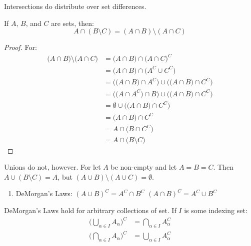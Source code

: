         Intersections do distribute over set differences.
        \begin{theorem}
            If $A$, $B$, and $C$ are sets, then:
            \begin{equation}
                A\cap(B\setminus{C})=
                (A\cap{B})\setminus(A\cap{C})
            \end{equation}
        \end{theorem}
        \begin{proof}
            For:
            \begin{subequations}
                \begin{align}
                    \big(A\cap{B}\big)\setminus\big(A\cap{C}\big)
                    &=\big(A\cap{B}\big)\cap\big(A\cap{C}\big)^{C}\\
                    &=\big(A\cap{B}\big)\cap\big(A^{C}\cup{C}^{C}\big)\\
                    &=\Big(\big(A\cap{B}\big)\cap{A}^{C}\Big)
                        \cup\Big(\big({A}\cap{B}\big)\cap{C}^{C}\Big)\\
                    &=\Big(\big(A\cap{A}^{C}\big)\cap{B}\Big)\cup
                        \Big(\big(A\cap{B}\big)\cap{C}^{C}\Big)\\
                    &=\emptyset\cup
                        \Big(\big(A\cap{B}\big)\cap{C}^{C}\Big)\\
                    &=\big(A\cap{B}\big)\cap{C}^{C}\\
                    &=A\cap\big(B\cap{C}^{C}\big)\\
                    &=A\cap\big(B\setminus{C}\big)
                \end{align}
            \end{subequations}
        \end{proof}
        Unions do not, however. For let $A$ be non-empty and let
        $A=B=C$. Then $A\cup(B\setminus{C})=A$, but
        $(A\cup{B})\setminus(A\cup{C})=\emptyset$.
        \begin{enumerate}
            \item DeMorgan's Laws:
                  \subitem $(A\cup{B})^{C}=A^{C}\cap{B}^{C}$
                  \subitem $(A\cap{B})^{C}=A^{C}\cup{B}^{C}$
        \end{enumerate}
        DeMorgan's Laws hold for arbitrary collections
        of set. If $I$ is some indexing set:
        \begin{align}
            \Big(\bigcup_{\alpha\in{I}}A_{\alpha}\Big)^{C}
            &=\bigcap_{\alpha\in{I}}A_{\alpha}^{C}\\
            \Big(\bigcap_{\alpha\in{I}}A_{\alpha}\Big)^{C}
            &=\bigcup_{\alpha\in{I}}A_{\alpha}^{C}
        \end{align}
